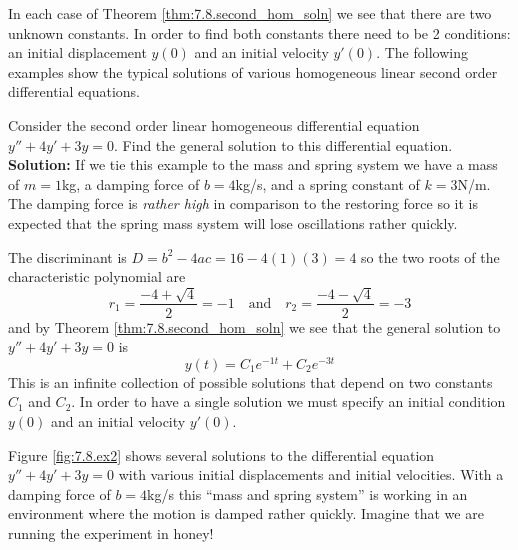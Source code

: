 In each case of Theorem \ref{thm:7.8.second_hom_soln} we see that there are two unknown
constants.  In order to find both constants there need to be 2 conditions: an initial
displacement $y(0)$ and an initial velocity $y'(0)$.
The following examples show the typical solutions of various homogeneous linear second
order differential equations. 



\begin{example}\label{ex:7.8.ex1}
Consider the second order linear homogeneous differential equation $y'' + 4y' + 3y = 0$.
Find the general solution to this differential equation.
\\{\bf Solution:}
If we tie this example to the mass and spring system we have a mass of $m=1$kg, a damping
force of $b=4$kg/s, and a spring constant of $k=3$N/m.  The damping force is {\it rather
high} in comparison to the restoring force so it is expected that the spring mass system
will lose oscillations rather quickly.

The discriminant is $D = b^2 - 4ac = 16-4(1)(3)=4$ so the two roots of the characteristic
polynomial are
\[ r_1 = \frac{-4 + \sqrt{4}}{2} = -1 \quad \text{and} \quad r_2 = \frac{-4 - \sqrt{4}}{2}
    = -3 \]
and by Theorem \ref{thm:7.8.second_hom_soln} we see that the general solution to $y'' +
4y'+3y=0$ is
\[ y(t) = C_1 e^{-1t} + C_2 e^{-3t} \]
This is an infinite collection of possible solutions that depend on two constants
$C_1$ and $C_2$.  In order to have a single solution we must specify an initial
condition $y(0)$ and an initial velocity $y'(0)$.

Figure \ref{fig:7.8.ex2} shows several solutions to the differential equation $y'' +
4y'+3y=0$ with various initial displacements and initial velocities. With a
damping force of $b=4$kg/s this ``mass and spring system'' is working in an
environment where the motion is damped rather quickly.  Imagine that we are
running the experiment in honey!
\end{example}


